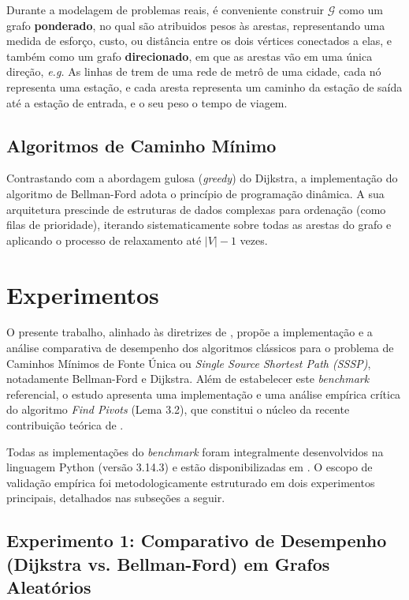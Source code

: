 \documentclass[10pt,a4paper]{article}
\begin{document}
Durante a modelagem de problemas reais, é conveniente construir $\mathcal{G}$ como um grafo \textbf{ponderado}, no qual são atribuidos pesos às arestas, representando uma medida de esforço, custo, ou distância entre os dois vértices conectados a elas, e também como um grafo \textbf{direcionado}, em que as arestas vão em uma única direção, \textit{e.g.} As linhas de trem de uma rede de metrô de uma cidade, cada nó representa uma estação, e cada aresta representa um caminho da estação de saída até a estação de entrada, e o seu peso o tempo de viagem.


\subsection{Algoritmos de Caminho Mínimo}

Contrastando com a abordagem gulosa (\textit{greedy}) do Dijkstra, a implementação do algoritmo de Bellman-Ford adota o princípio de programação dinâmica. A sua arquitetura prescinde de estruturas de dados complexas para ordenação (como filas de prioridade), iterando sistematicamente sobre todas as arestas do grafo e aplicando o processo de relaxamento até $|V| - 1$ vezes. 

\section{Experimentos}

O presente trabalho, alinhado às diretrizes de \citep{TP01}, propõe a implementação e a análise comparativa de desempenho dos algoritmos clássicos para o problema de Caminhos Mínimos de Fonte Única ou \textit{Single Source Shortest Path (SSSP)}, notadamente Bellman-Ford e Dijkstra. Além de estabelecer este \textit{benchmark} referencial, o estudo apresenta uma implementação e uma análise empírica crítica do algoritmo \textit{Find Pivots} (Lema 3.2), que constitui o núcleo da recente contribuição teórica de \cite{breakingTheSortingBarrier}.

Todas as implementações do \textit{benchmark} foram integralmente desenvolvidos na linguagem Python (versão 3.14.3) e estão disponibilizadas em \citep{ribas2026sssp}. O escopo de validação empírica foi metodologicamente estruturado em dois experimentos principais, detalhados nas subseções a seguir.

\subsection{Experimento 1: Comparativo de Desempenho (Dijkstra vs. Bellman-Ford) em Grafos Aleatórios}
\end{document}

